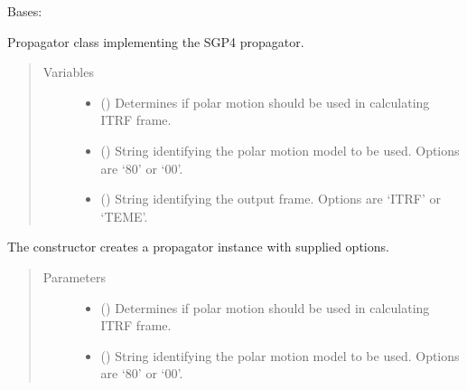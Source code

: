 \documentclass[letterpaper,10pt,english]{sphinxmanual}
\begin{document}
\begin{fulllineitems}
\label{\detokenize{modules/propagator_sgp4:propagator_sgp4.PropagatorSGP4}}
Bases: {\hyperref[\detokenize{modules/propagator_base:propagator_base.PropagatorBase}]{}}

Propagator class implementing the SGP4 propagator.
\begin{quote}\begin{description}
\item[{Variables}] \leavevmode\begin{itemize}
\item {} 
 () \textendash{} Determines if polar motion should be used in calculating ITRF frame.

\item {} 
 () \textendash{} String identifying the polar motion model to be used. Options are ‘80’ or ‘00’.

\item {} 
 () \textendash{} String identifying the output frame. Options are ‘ITRF’ or ‘TEME’.

\end{itemize}

\end{description}\end{quote}

The constructor creates a propagator instance with supplied options.
\begin{quote}\begin{description}
\item[{Parameters}] \leavevmode\begin{itemize}
\item {} 
 () \textendash{} Determines if polar motion should be used in calculating ITRF frame.

\item {} 
 () \textendash{} String identifying the polar motion model to be used. Options are ‘80’ or ‘00’.


\end{itemize}
\end{description}
\end{quote}
\end{fulllineitems}
\end{document}
